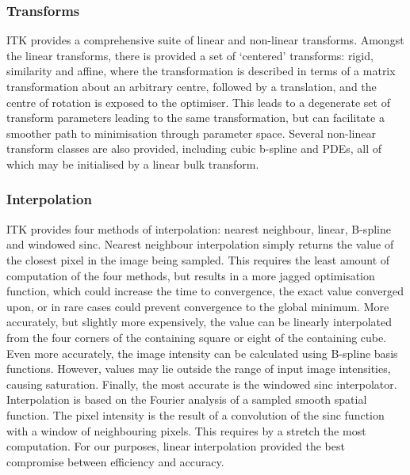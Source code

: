     \subsubsection{Transforms} %
    \label{ssub:transforms}
      ITK provides a comprehensive suite of linear and non-linear transforms. Amongst the linear transforms, there is provided a set of `centered' transforms: rigid, similarity and affine, where the transformation is described in terms of a matrix transformation about an arbitrary centre, followed by a translation, and the centre of rotation is exposed to the optimiser. This leads to a degenerate set of transform parameters leading to the same transformation, but can facilitate a smoother path to minimisation through parameter space. Several non-linear transform classes are also provided, including cubic b-spline and PDEs, all of which may be initialised by a linear bulk transform.
    
    \subsubsection{Interpolation} %
    \label{ssub:interpolation}
      ITK provides four methods of interpolation: nearest neighbour, linear, B-spline and windowed sinc. Nearest neighbour interpolation simply returns the value of the closest pixel in the image being sampled. This requires the least amount of computation of the four methods, but results in a more jagged optimisation function, which could increase the time to convergence, the exact value converged upon, or in rare cases could prevent convergence to the global minimum. More accurately, but slightly more expensively, the value can be linearly interpolated from the four corners of the containing square or eight of the containing cube. Even more accurately, the image intensity can be calculated using B-spline basis functions. However, values may lie outside the range of input image intensities, causing saturation. Finally, the most accurate is the windowed sinc interpolator. Interpolation is based on the Fourier analysis of a sampled smooth spatial function. The pixel intensity is the result of a convolution of the sinc function with a window of neighbouring pixels. This requires by a stretch the most computation. For our purposes, linear interpolation provided the best compromise between efficiency and accuracy.
  
